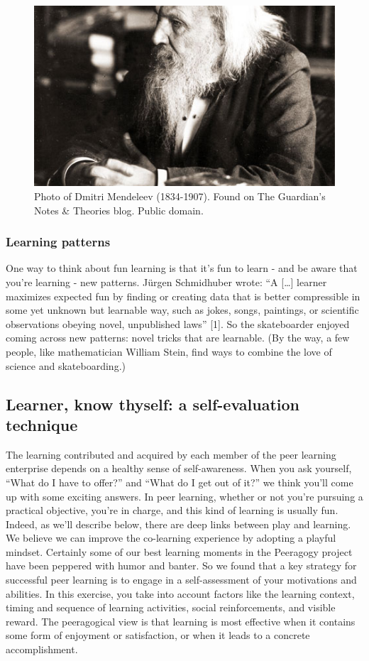 \begin{figure}
\begin{center}
\includegraphics[width=.8\textwidth]{../pictures/mendeleev.jpg}
\end{center}
\caption*{Photo of Dmitri Mendeleev (1834-1907). Found on The Guardian's Notes \&
Theories blog. Public domain.}
\end{figure}

\subsubsection{Learning patterns}

One way to think about fun learning is that it's fun to learn - and be
aware that you're learning - new patterns. Jürgen Schmidhuber wrote: ``A
{[}\ldots{}{]} learner maximizes expected fun by finding or creating
data that is better compressible in some yet unknown but learnable way,
such as jokes, songs, paintings, or scientific observations obeying
novel, unpublished laws'' {[}1{]}. So the skateboarder enjoyed coming
across new patterns: novel tricks that are learnable. (By the way, a few
people, like mathematician William Stein, find ways to combine the love
of science and skateboarding.)

\subsection{Learner, know thyself: a self-evaluation technique}

The learning contributed and acquired by each member of the peer
learning enterprise depends on a healthy sense of self-awareness. When
you ask yourself, ``What do I have to offer?'' and ``What do I get out
of it?'' we think you'll come up with some exciting answers. In peer
learning, whether or not you're pursuing a practical objective, you're
in charge, and this kind of learning is usually fun. Indeed, as we'll
describe below, there are deep links between play and learning. We
believe we can improve the co-learning experience by adopting a playful
mindset. Certainly some of our best learning moments in the Peeragogy
project have been peppered with humor and banter. So we found that a key
strategy for successful peer learning is to engage in a self-assessment
of your motivations and abilities. In this exercise, you take into
account factors like the learning context, timing and sequence of
learning activities, social reinforcements, and visible reward. The
peeragogical view is that learning is most effective when it contains
some form of enjoyment or satisfaction, or when it leads to a concrete
accomplishment.

